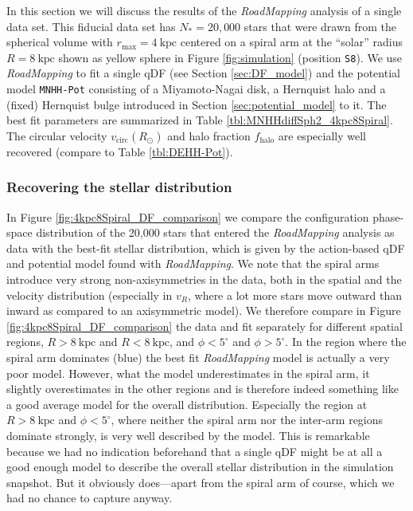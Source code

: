 \documentclass[iop,revtex4,numberedappendix,appendixfloats]{emulateapj}
\newcommand{\RM}{{\sl RoadMapping}}
\begin{document}
In this section we will discuss the results of the \RM{} analysis of a single data set. This fiducial data set has $N_*=20,000$ stars that were drawn from the spherical volume with $r_\text{max}=4~\text{kpc}$ centered on a spiral arm at the ``solar'' radius $R=8~\text{kpc}$ shown as yellow sphere in Figure \ref{fig:simulation} (position \texttt{S8}). We use \RM{} to fit a single qDF (see Section \ref{sec:DF_model}) and the potential model \texttt{MNHH-Pot} consisting of a Miyamoto-Nagai disk, a Hernquist halo and a (fixed) Hernquist bulge introduced in Section \ref{sec:potential_model} to it. The best fit parameters are summarized in Table \ref{tbl:MNHHdiffSph2_4kpc8Spiral}. The circular velocity $v_\text{circ}(R_\odot)$ and halo fraction $f_\text{halo}$ are especially well recovered (compare to Table \ref{tbl:DEHH-Pot}).

\subsubsection{Recovering the stellar distribution} \label{sec:4kpc8Spiral_DF}

In Figure \ref{fig:4kpc8Spiral_DF_comparison} we compare the configuration phase-space distribution of the 20,000 stars that entered the \RM{} analysis as data with the best-fit stellar distribution, which is given by the action-based qDF and potential model found with \RM{}. We note that the spiral arms introduce very strong non-axisymmetries in the data, both in the spatial and the velocity distribution (especially in $v_R$, where a lot more stars move outward than inward as compared to an axisymmetric model). We therefore compare in Figure \ref{fig:4kpc8Spiral_DF_comparison} the data and fit separately for different spatial regions, $R>8~\text{kpc}$ and $R<8~\text{kpc}$, and $\phi<5^\circ$ and $\phi>5^\circ$. In the region where the spiral arm dominates (blue) the best fit \RM{} model is actually a very poor model. However, what the model underestimates in the spiral arm, it slightly overestimates in the other regions and is therefore indeed something like a good average model for the overall distribution. Especially the region at $R>8~\text{kpc}$ and $\phi<5^\circ$, where neither the spiral arm nor the inter-arm regions dominate strongly, is very well described by the model. This is remarkable because we had no indication beforehand that a single qDF might be at all a good enough model to describe the overall stellar distribution in the simulation snapshot. But it obviously does---apart from the spiral arm of course, which we had no chance to capture anyway.
\end{document}
